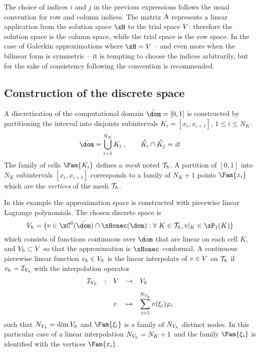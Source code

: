\medskip
\begin{rmrk}
The choice of indices $i$ and $j$ in the previous expressions follows the usual convention for row and column indices. The matrix ${\mathrm A}$ represents a linear application from the solution space $\xH$ to the trial space ${V}$: therefore the solution space is the column space, while the trial space is the row space.
In the case of Galerkin approximations where $\xH = \xV$ -- and even more when the bilinear form is symmetric -- it is tempting to choose the indices arbitrarily, but for the sake of consistency following the convention is recommended.
\end{rmrk}

\subsection{Construction of the discrete space}

A discretization of the computational domain $\bar\dom = [0,1]$ is constructed by partitioning the interval into disjoints subintervals $K_i = [x_{i}, x_{i+1}]$, $1\leq i \leq N_K$.
\begin{equation*}
\bar\dom = \displaystyle\Union_{i = 1}^{N_K} K_i\;,\qquad \Interior{K_i}\cap \Interior{K_j} = \Empty
\end{equation*}
The family of cells $\Fam{K_i}$ defines a \textit{mesh} noted ${\mathcal T}_h$.
A partition of $[0,1]$ into $N_K$ subintervals $[x_i, x_{i+1}]$ corresponds to a family of $N_K+1$ points $\Fam{x_i}$ which are the \textit{vertices} of the mesh ${\mathcal T}_h$.

\medskip
In this example the approximation space is constructed with piecewise linear Lagrange polynomials.
The chosen discrete space is
\begin{equation}\label{sp:lagrangeP1}
\xVh = \lbrace v \in \xC^0(\bar\dom)\cap\xHonec(\dom) : \forany K \in \meshT, v\rvert_{K} \in \xPone(K) \rbrace
\end{equation}
which consists of functions continuous over $\bar\dom$ that are linear on each cell $K$, and ${{V}}_h \subset {V}$ so that the approximation is $\xHonec$--conformal.
A continuous piecewise linear function $v_h \in {{V}}_h$ is the linear interpolate of $v\in{V}$ on ${\mathcal T}_h$ if $v_h = \mathop{\mathcal{I}_{{{V}}_h}}$ with the interpolation operator
\begin{equation}\label{fem:lagrange_interpolator}
\begin{array}{lclcl}
\mathop{\mathcal{I}_{{{V}}_h}} &:& {V} &\rightarrow& {{V}}_h\\[2ex]
           & & v   &\mapsto    & \displaystyle\sum_{i=1}^{{N_{{{V}}_h}}} v(\xi_i) \varphi_i
\end{array}
\end{equation}
such that ${N_{{{V}}_h}} = \dim{{{V}}_h}$ and $\Fam{\xi_i}$ is a family of ${N_{{{V}}_h}}$ distinct nodes.
In this particular case of a linear interpolation ${N_{{{V}}_h}} = N_K + 1$ and the family $\Fam{\xi_i}$ is identified with the vertices $\Fam{x_i}$.

